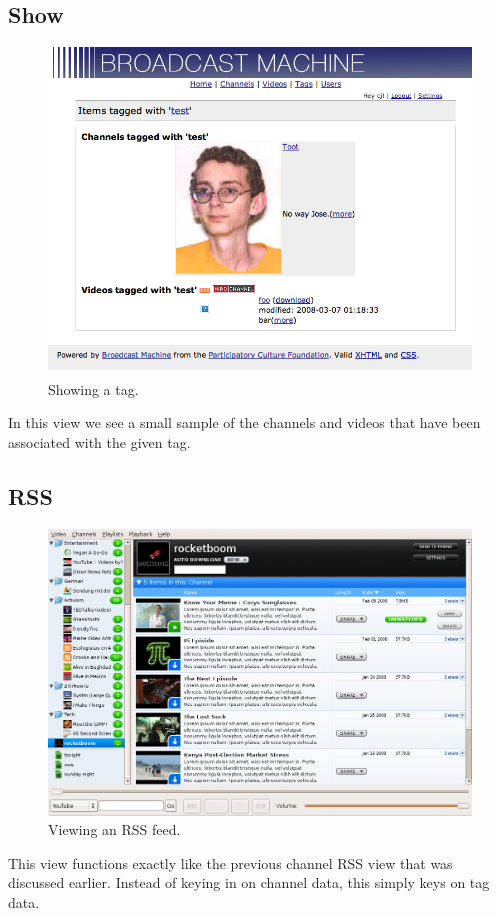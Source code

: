 \documentclass[a4paper,12pt]{report}
\begin{document}
\subsection{Show}
\begin{figure}[h]
\begin{center}
\includegraphics[width=150mm]{./images/tagshow.png}
\end{center}
\caption{Showing a tag.}
\end{figure}

In this view we see a small sample of the channels and videos that have been associated with the given tag.

\subsection{RSS}
\begin{figure}[h]
\begin{center}
\includegraphics[width=150mm]{./images/channelrss.png}
\end{center}
\caption{Viewing an RSS feed.}
\end{figure}
This view functions exactly like the previous channel RSS view that was discussed earlier.
Instead of keying in on channel data, this simply keys on tag data.
\end{document}
